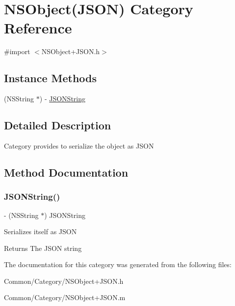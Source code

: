 \hypertarget{category_n_s_object_07_j_s_o_n_08}{}\section{N\+S\+Object(J\+S\+ON) Category Reference}
\label{category_n_s_object_07_j_s_o_n_08}


{\ttfamily \#import $<$N\+S\+Object+\+J\+S\+O\+N.\+h$>$}

\subsection*{Instance Methods}
\begin{DoxyCompactItemize}
\item 
(N\+S\+String $\ast$) -\/ \hyperlink{category_n_s_object_07_j_s_o_n_08_ac8c49960852c92fbf082e72dc6e5c70a}{J\+S\+O\+N\+String}
\end{DoxyCompactItemize}


\subsection{Detailed Description}
Category provides to serialize the object as J\+S\+ON 

\subsection{Method Documentation}
\hypertarget{category_n_s_object_07_j_s_o_n_08_ac8c49960852c92fbf082e72dc6e5c70a}{}\label{category_n_s_object_07_j_s_o_n_08_ac8c49960852c92fbf082e72dc6e5c70a} 
\subsubsection{\texorpdfstring{J\+S\+O\+N\+String()}{JSONString()}}
{\footnotesize\ttfamily -\/ (N\+S\+String $\ast$) J\+S\+O\+N\+String \begin{DoxyParamCaption}{ }\end{DoxyParamCaption}}

Serializes itself as J\+S\+ON \begin{DoxyReturn}{Returns}
The J\+S\+ON string 
\end{DoxyReturn}


The documentation for this category was generated from the following files\+:\begin{DoxyCompactItemize}
\item 
Common/\+Category/N\+S\+Object+\+J\+S\+O\+N.\+h\item 
Common/\+Category/N\+S\+Object+\+J\+S\+O\+N.\+m\end{DoxyCompactItemize}
